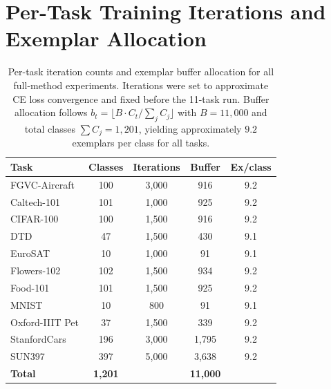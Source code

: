 \documentclass{article}
\begin{document}
  \section{Per-Task Training Iterations and Exemplar Allocation}
  \label{app:iterations}

  \begin{table}[h]
  \centering
  \caption{Per-task iteration counts and exemplar buffer allocation for all
  full-method experiments. Iterations were set to approximate CE loss
  convergence and fixed before the 11-task run. Buffer allocation follows
  $b_t = \lfloor B \cdot C_t / \sum_{j} C_j \rfloor$ with $B{=}11{,}000$
  and total classes $\sum C_j = 1{,}201$, yielding approximately $9.2$
  exemplars per class for all tasks.}
  \label{tab:iterations}
  \begin{tabular}{lcccc}
  \toprule
  \textbf{Task} & \textbf{Classes} & \textbf{Iterations} & \textbf{Buffer} & \textbf{Ex/class} \\
  \midrule
  FGVC-Aircraft    & 100 & 3{,}000 & 916   & 9.2 \\
  Caltech-101      & 101 & 1{,}000 & 925   & 9.2 \\
  CIFAR-100        & 100 & 1{,}500 & 916   & 9.2 \\
  DTD              &  47 & 1{,}500 & 430   & 9.1 \\
  EuroSAT          &  10 & 1{,}000 &  91   & 9.1 \\
  Flowers-102      & 102 & 1{,}500 & 934   & 9.2 \\
  Food-101         & 101 & 1{,}500 & 925   & 9.2 \\
  MNIST            &  10 &     800 &  91   & 9.1 \\
  Oxford-IIIT Pet  &  37 & 1{,}500 & 339   & 9.2 \\
  StanfordCars     & 196 & 3{,}000 & 1{,}795 & 9.2 \\
  SUN397           & 397 & 5{,}000 & 3{,}638 & 9.2 \\
  \midrule
  \textbf{Total}   & \textbf{1{,}201} & & \textbf{11{,}000} & \\
  \bottomrule
  \end{tabular}
  \end{table}

 
  

  
\end{document}
